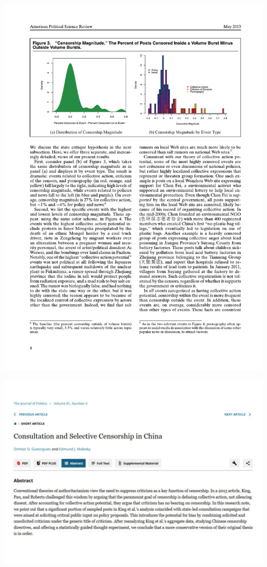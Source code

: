 \documentclass[
  10pt,
  ignorenonframetext,
]{beamer}
\begin{document}
\begin{frame}
\begin{center}\includegraphics[width=0.9\linewidth]{Figs/Examples/molly_res} \end{center}
\end{frame}

\begin{frame}
\begin{center}\includegraphics[width=0.9\linewidth]{Figs/Examples/molly_counter} \end{center}
\end{frame}
\end{document}
